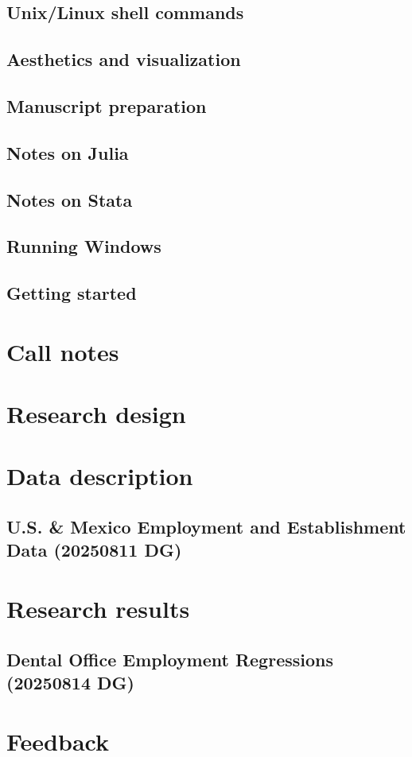 \documentclass{report}
\numberwithin{equation}{section}
\numberwithin{figure}{section}
\numberwithin{table}{section}
\begin{document}
\section{Unix/Linux shell commands} 
\section{Aesthetics and visualization} 
\section{Manuscript preparation} 
\section{Notes on Julia} 
\section{Notes on Stata} 
\section{Running Windows} 

\section{Getting started} 

\chapter{Call notes}

\chapter{Research design}

\chapter{Data description}
\section{U.S. \& Mexico Employment and Establishment Data (20250811 DG)} 

\chapter{Research results}
\section{Dental Office Employment Regressions (20250814 DG)} 

\chapter{Feedback}

\end{document}
